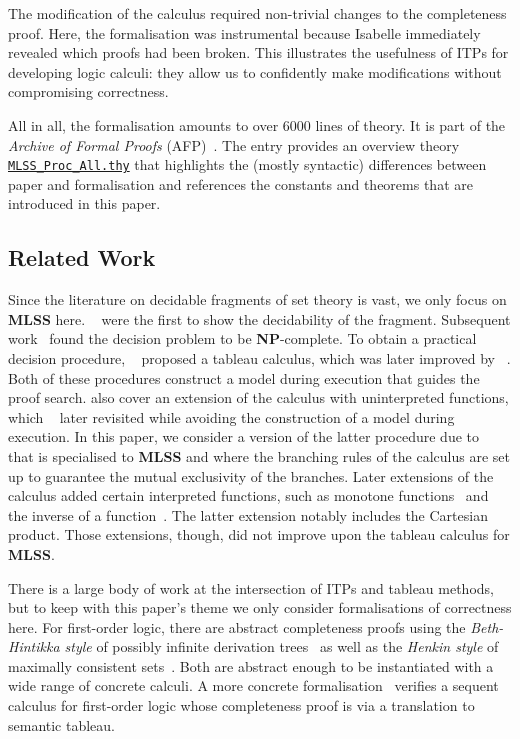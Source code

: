 \documentclass[runningheads]{llncs}
\newcommand{\MLSS}{\textbf{MLSS}}
\begin{document}
The modification of the calculus required non-trivial changes to the completeness proof.
Here, the formalisation was instrumental because Isabelle immediately revealed which proofs had been broken.
This illustrates the usefulness of ITPs for developing logic calculi: they allow us to confidently make modifications without compromising correctness. 

All in all, the formalisation amounts to over 6000 lines of theory.
It is part of the \emph{Archive of Formal Proofs} (AFP)~\cite{formalisation}.
The entry provides an overview theory \href{https://www.isa-afp.org/theories/mlss_decision_proc/#MLSS_Proc_All}{\texttt{MLSS\_Proc\_All.thy}} that highlights the (mostly syntactic) differences between paper and formalisation and references the constants and theorems that are introduced in this paper. 

\subsection{Related Work}
Since the literature on decidable fragments of set theory is vast, we only focus on \MLSS{} here.
\citeauthor{mlss_first}~\cite{mlss_first} were the first to show the decidability of the fragment.
Subsequent work~\cite{mlss_np} found the decision problem to be \textbf{NP}-complete.
To obtain a practical decision procedure, \citeauthor{mlss_first_tableau}~\cite{mlss_first_tableau} proposed a tableau calculus, which was later improved by \citeauthor{tableau_quantifier_free}~\cite{tableau_quantifier_free}.
Both of these procedures construct a model during execution that guides the proof search.
\citeauthor{tableau_quantifier_free} also cover an extension of the calculus with uninterpreted functions, which \citeauthor{mlss_quantification}~\cite{mlss_quantification} later revisited while avoiding the construction of a model during execution.
In this paper, we consider a version of the latter procedure due to \citeauthor{new_fast_tableau}~\cite{new_fast_tableau} that is specialised to \MLSS{} and where the branching rules of the calculus are set up to guarantee the mutual exclusivity of the branches.
Later extensions of the calculus added certain interpreted functions, such as monotone functions~\cite{mlss_monotone_functions} and the inverse of a function~\cite{mlss_cartesian_map}.
The latter extension notably includes the Cartesian product.
Those extensions, though, did not improve upon the tableau calculus for \MLSS{}.

There is a large body of work at the intersection of ITPs and tableau methods, but to keep with this paper's theme we only consider formalisations of correctness here.
For first-order logic, there are abstract completeness proofs using the \emph{Beth-Hintikka style} of possibly infinite derivation trees~\cite{completeness_coinductive} as well as the \emph{Henkin style} of maximally consistent sets~\cite{synthetic_completeness_afp}.
Both are abstract enough to be instantiated with a wide range of concrete calculi.
A more concrete formalisation~\cite{sequent_first_order} verifies a sequent calculus for first-order logic whose completeness proof is via a translation to semantic tableau.
\end{document}
